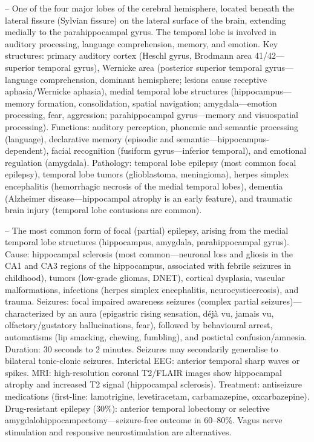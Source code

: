 -- One of the four major lobes of the cerebral hemisphere, located beneath the lateral fissure (Sylvian fissure) on the lateral surface of the brain, extending medially to the parahippocampal gyrus. The temporal lobe is involved in auditory processing, language comprehension, memory, and emotion. Key structures: primary auditory cortex (Heschl gyrus, Brodmann area 41/42—superior temporal gyrus), Wernicke area (posterior superior temporal gyrus—language comprehension, dominant hemisphere; lesions cause receptive aphasia/Wernicke aphasia), medial temporal lobe structures (hippocampus—memory formation, consolidation, spatial navigation; amygdala—emotion processing, fear, aggression; parahippocampal gyrus—memory and visuospatial processing). Functions: auditory perception, phonemic and semantic processing (language), declarative memory (episodic and semantic—hippocampus-dependent), facial recognition (fusiform gyrus—inferior temporal), and emotional regulation (amygdala). Pathology: temporal lobe epilepsy (most common focal epilepsy), temporal lobe tumors (glioblastoma, meningioma), herpes simplex encephalitis (hemorrhagic necrosis of the medial temporal lobes), dementia (Alzheimer disease—hippocampal atrophy is an early feature), and traumatic brain injury (temporal lobe contusions are common).

-- The most common form of focal (partial) epilepsy, arising from the medial temporal lobe structures (hippocampus, amygdala, parahippocampal gyrus). Cause: hippocampal sclerosis (most common—neuronal loss and gliosis in the CA1 and CA3 regions of the hippocampus, associated with febrile seizures in childhood), tumors (low-grade gliomas, DNET), cortical dysplasia, vascular malformations, infections (herpes simplex encephalitis, neurocysticercosis), and trauma. Seizures: focal impaired awareness seizures (complex partial seizures)—characterized by an aura (epigastric rising sensation, déjà vu, jamais vu, olfactory/gustatory hallucinations, fear), followed by behavioural arrest, automatisms (lip smacking, chewing, fumbling), and postictal confusion/amnesia. Duration: 30 seconds to 2 minutes. Seizures may secondarily generalise to bilateral tonic-clonic seizures. Interictal EEG: anterior temporal sharp waves or spikes. MRI: high-resolution coronal T2/FLAIR images show hippocampal atrophy and increased T2 signal (hippocampal sclerosis). Treatment: antiseizure medications (first-line: lamotrigine, levetiracetam, carbamazepine, oxcarbazepine). Drug-resistant epilepsy (30\%): anterior temporal lobectomy or selective amygdalohippocampectomy—seizure-free outcome in 60--80\%. Vagus nerve stimulation and responsive neurostimulation are alternatives.

